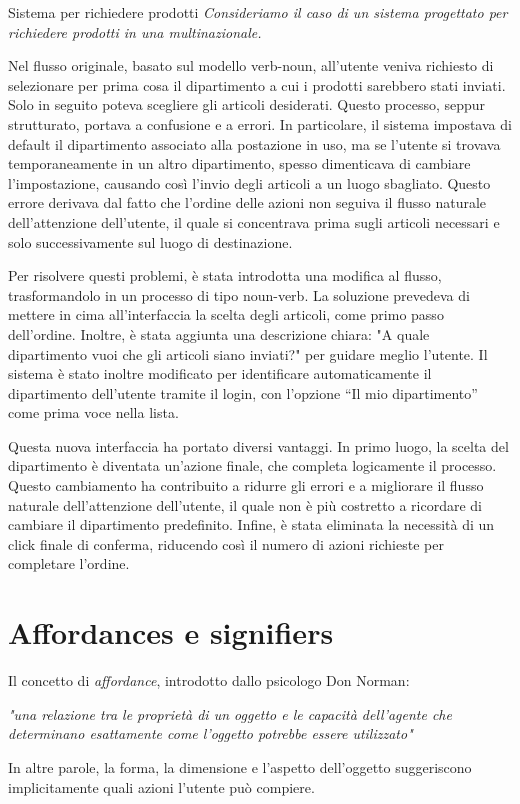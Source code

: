 \begin{Example}{Sistema per richiedere prodotti}{}
\textit{Consideriamo il caso di un sistema progettato per richiedere prodotti in una multinazionale.}

Nel flusso originale, basato sul modello verb-noun, all'utente veniva richiesto di selezionare per prima cosa il dipartimento a cui i prodotti sarebbero stati inviati. Solo in seguito poteva scegliere gli articoli desiderati. Questo processo, seppur strutturato, portava a confusione e a errori. In particolare, il sistema impostava di default il dipartimento associato alla postazione in uso, ma se l’utente si trovava temporaneamente in un altro dipartimento, spesso dimenticava di cambiare l'impostazione, causando così l’invio degli articoli a un luogo sbagliato. Questo errore derivava dal fatto che l’ordine delle azioni non seguiva il flusso naturale dell'attenzione dell’utente, il quale si concentrava prima sugli articoli necessari e solo successivamente sul luogo di destinazione.

Per risolvere questi problemi, è stata introdotta una modifica al flusso, trasformandolo in un processo di tipo noun-verb. La soluzione prevedeva di mettere in cima all'interfaccia la scelta degli articoli, come primo passo dell’ordine. Inoltre, è stata aggiunta una descrizione chiara: "A quale dipartimento vuoi che gli articoli siano inviati?" per guidare meglio l’utente. Il sistema è stato inoltre modificato per identificare automaticamente il dipartimento dell’utente tramite il login, con l’opzione “Il mio dipartimento” come prima voce nella lista.

Questa nuova interfaccia ha portato diversi vantaggi. In primo luogo, la scelta del dipartimento è diventata un’azione finale, che completa logicamente il processo. Questo cambiamento ha contribuito a ridurre gli errori e a migliorare il flusso naturale dell'attenzione dell'utente, il quale non è più costretto a ricordare di cambiare il dipartimento predefinito. Infine, è stata eliminata la necessità di un click finale di conferma, riducendo così il numero di azioni richieste per completare l'ordine.
\end{Example}

\section{Affordances e signifiers}
Il concetto di \textit{affordance}, introdotto dallo psicologo Don Norman:
\begin{center}
\textit{"una relazione tra le proprietà di un oggetto e le capacità dell'agente che determinano esattamente come l'oggetto potrebbe essere utilizzato"}
\end{center}
In altre parole, la forma, la dimensione e l'aspetto dell'oggetto suggeriscono implicitamente quali azioni l’utente può compiere.

